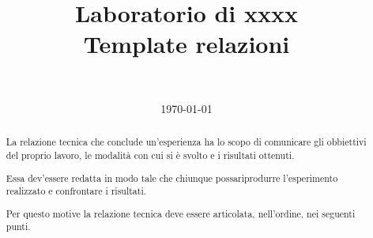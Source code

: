 \documentclass[a4paper]{article}
\title{Laboratorio di xxxx \\ \huge{Template relazioni}}
\author{\nome \ \cognome}
\date{\today} %
\begin{document}
\begingroup
  \maketitle
  \thispagestyle{fancy}
\endgroup

    \begin{mdframed}[style=mdfabstract]
        \begin{abstract}
            La relazione tecnica che conclude un'esperienza ha lo scopo di comunicare gli obbiettivi del proprio lavoro, le modalit\`a con cui si \`e svolto e i risultati ottenuti.
            
            Essa dev'essere redatta in modo tale che chiunque possariprodurre l'esperimento realizzato e confrontare i risultati.
            
            Per questo motive la relazione tecnica deve essere articolata, nell'ordine, nei seguenti punti.
        \end{abstract}
    \end{mdframed}
\begingroup
\let\clearpage\relax %








\endgroup


\end{document}
